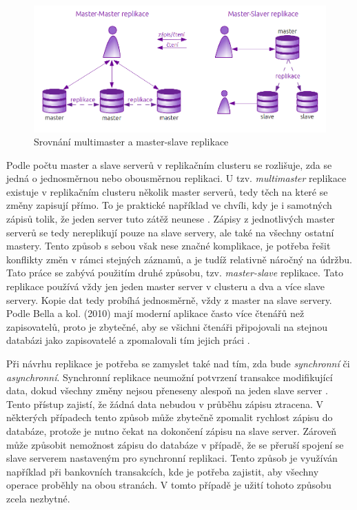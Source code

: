           \begin{figure}[H]
            \centering
            \includegraphics[scale=1]{../../../grafy/obr/schema_masterMasterSlave.png}
            \caption {Srovnání multimaster a master-slave replikace}
            \label{srovnaniM-M-S}
          \end{figure}

          Podle počtu master a slave serverů v replikačním clusteru se rozlišuje, zda se jedná o jednosměrnou nebo obousměrnou replikaci. U tzv. {\it multimaster} replikace existuje v replikačním clusteru několik master serverů, tedy těch na které se změny zapisují přímo. To je praktické například ve chvíli, kdy je i samotných zápisů tolik, že jeden server tuto zátěž neunese . Zápisy z jednotlivých master serverů se tedy nereplikují pouze na slave servery, ale také na všechny ostatní mastery. Tento způsob s sebou však nese značné komplikace, je potřeba řešit konflikty změn v rámci stejných záznamů, a je tudíž relativně náročný na údržbu. Tato práce se zabývá použitím druhé způsobu, tzv. {\it master-slave} replikace. Tato replikace používá vždy jen jeden master server v clusteru a dva a více slave servery. Kopie dat tedy probíhá jednosměrně, vždy z master na slave servery. Podle Bella a kol. (2010) mají moderní aplikace často více čtenářů než zapisovatelů, proto je zbytečné, aby se všichni čtenáři připojovali na stejnou databázi jako zapisovatelé a zpomalovali tím jejich práci \citep{BellKindahlThalmann2010}.

          Při návrhu replikace je potřeba se zamyslet také nad tím, zda bude {\it synchronní} či {\it asynchronní}. Synchronní replikace neumožní potvrzení transakce modifikující data, dokud všechny změny nejsou přeneseny alespoň na jeden slave server \citep{Boszormenyi2013}. Tento přístup zajistí, že žádná data nebudou v průběhu zápisu ztracena. V některých případech tento způsob může zbytečně zpomalit rychlost zápisu do databáze, protože je nutno čekat na dokončení zápisu na slave server. Zároveň může způsobit nemožnost zápisu do databáze v případě, že se přeruší spojení se slave serverem nastaveným pro synchronní replikaci. Tento způsob je využíván například při bankovních transakcích, kde je potřeba zajistit, aby všechny operace proběhly na obou stranách. V tomto případě je užití tohoto způsobu zcela nezbytné. 

